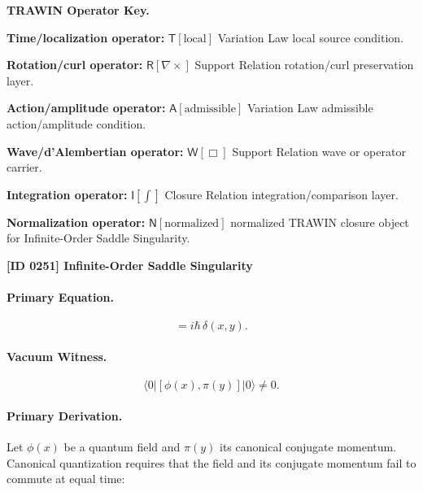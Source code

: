 \par\vspace{0.45\baselineskip}
\noindent\begin{minipage}[t]{\linewidth}
\begingroup
\small
\raggedright
\textbf{TRAWIN Operator Key.}\par
\noindent\textbf{Time/localization operator:} $\mathsf{T}\!\left[\mathrm{local}\right]$ Variation Law local source condition.\par
\noindent\textbf{Rotation/curl operator:} $\mathsf{R}\!\left[\nabla\times\right]$ Support Relation rotation/curl preservation layer.\par
\noindent\textbf{Action/amplitude operator:} $\mathsf{A}\!\left[\mathrm{admissible}\right]$ Variation Law admissible action/amplitude condition.\par
\noindent\textbf{Wave/d'Alembertian operator:} $\mathsf{W}\!\left[\Box\right]$ Support Relation wave or operator carrier.\par
\noindent\textbf{Integration operator:} $\mathsf{I}\!\left[\int\right]$ Closure Relation integration/comparison layer.\par
\noindent\textbf{Normalization operator:} $\mathsf{N}\!\left[\mathrm{normalized}\right]$ normalized TRAWIN closure object for Infinite-Order Saddle Singularity.\par
\endgroup
\end{minipage}

\clearpage
\noindent\textbf{[ID 0251] Infinite-Order Saddle Singularity}\par
\vspace{0.35em}
\paragraph{Primary Equation.}
\begin{equation}
[\phi(x),\pi(y)] = i\hbar\,\delta(x,y).
\end{equation}

\paragraph{Vacuum Witness.}
\begin{equation}
\langle 0|[\phi(x),\pi(y)]|0\rangle \neq 0 .
\end{equation}

\paragraph{Primary Derivation.}
Let $\phi(x)$ be a quantum field and $\pi(y)$ its canonical conjugate momentum.  
Canonical quantization requires that the field and its conjugate momentum fail to commute at equal time:

